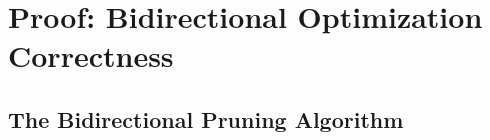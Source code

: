 
\section{Proof: Bidirectional Optimization Correctness}
\label{appendix:BidirectionalProof}

%
%
%
%
%

\subsection{The Bidirectional Pruning Algorithm}

